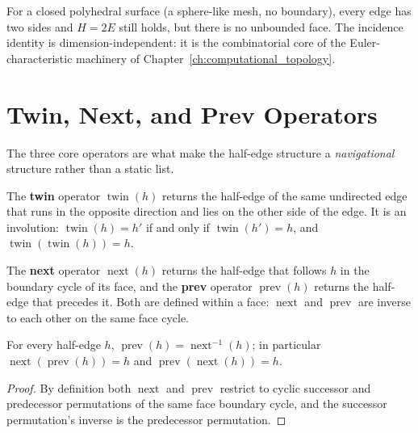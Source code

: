 \begin{remark}
For a closed polyhedral surface (a sphere-like mesh, no boundary), every
edge has two sides and $H = 2E$ still holds, but there is no unbounded
face. The incidence identity is dimension-independent: it is the
combinatorial core of the Euler-characteristic machinery of
Chapter~\ref{ch:computational_topology}.
\end{remark}


\section{Twin, Next, and Prev Operators}
\label{sec:halfedge_operators}

The three core operators are what make the half-edge structure a
\emph{navigational} structure rather than a static list.

\begin{definition}\label{def:hed_twin}
The \textbf{twin} operator $\operatorname{twin}(h)$ returns the half-edge
of the same undirected edge that runs in the opposite direction and lies on
the other side of the edge. It is an involution: $\operatorname{twin}(h) =
h'$ if and only if $\operatorname{twin}(h') = h$, and
$\operatorname{twin}(\operatorname{twin}(h)) = h$.
\end{definition}

\begin{definition}\label{def:hed_next_prev}
The \textbf{next} operator $\operatorname{next}(h)$ returns the half-edge
that follows $h$ in the boundary cycle of its face, and the \textbf{prev}
operator $\operatorname{prev}(h)$ returns the half-edge that precedes it.
Both are defined within a face: $\operatorname{next}$ and
$\operatorname{prev}$ are inverse to each other on the same face cycle.
\end{definition}

\begin{lemma}\label{lem:hed_inverse}
For every half-edge $h$,
$\operatorname{prev}(h) = \operatorname{next}^{-1}(h)$; in particular
$\operatorname{next}(\operatorname{prev}(h)) = h$ and
$\operatorname{prev}(\operatorname{next}(h)) = h$.
\end{lemma}

\begin{proof}
By definition both $\operatorname{next}$ and $\operatorname{prev}$ restrict
to cyclic successor and predecessor permutations of the same face boundary
cycle, and the successor permutation's inverse is the predecessor
permutation.
\end{proof}

